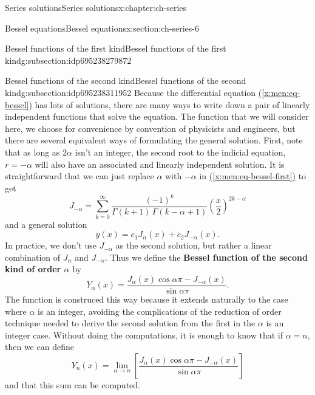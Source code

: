 \documentclass[oneside,10pt,]{book}
\newcommand{\xreffont}{\relax}
\newcommand{\terminology}[1]{\textbf{#1}}
\numberwithin{equation}{section}
\numberwithin{equation}{section}
\begin{document}
\begin{chapterptx}{Series solutions}{}{Series solutions}{}{}{x:chapter:ch-series}
\begin{sectionptx}{Bessel equations}{}{Bessel equations}{}{}{x:section:ch-series-6}
\begin{subsectionptx}{Bessel functions of the first kind}{}{Bessel functions of the first kind}{}{}{g:subsection:idp695238279872}
\end{subsectionptx}
%
%
\typeout{************************************************}
\typeout{************************************************}
%
\begin{subsectionptx}{Bessel functions of the second kind}{}{Bessel functions of the second kind}{}{}{g:subsection:idp695238311952}
Because the differential equation \hyperref[x:men:eq-bessel]{({\xreffont\ref{x:men:eq-bessel}})} has lots of solutions, there are many ways to write down a pair of linearly independent functions that solve the equation. The function that we will consider here, we choose for convenience by convention of physicists and engineers, but there are several equivalent ways of formulating the general solution. First, note that as long as \(2\alpha\) isn't an integer, the second root to the indicial equation, \(r = -\alpha\) will also have an associated and linearly independent solution. It is straightforward that we can just replace \(\alpha\) with \(-\alpha\) in \hyperref[x:men:eq-bessel-first]{({\xreffont\ref{x:men:eq-bessel-first}})} to get%
\begin{equation*}
J_{-\alpha} = \sum_{k=0}^\infty \frac{(-1)^k}{\Gamma(k + 1) \, \Gamma(k - \alpha + 1)} \left(\frac{x}{2}\right)^{2k - \alpha}
\end{equation*}
and a general solution%
\begin{equation*}
y(x) = c_1 J_\alpha(x) + c_2 J_{-\alpha}(x).
\end{equation*}
In practice, we don't use \(J_{-\alpha}\) as the second solution, but rather a linear combination of \(J_{\alpha}\) and \(J_{-\alpha}\). Thus we define the \terminology{Bessel function of the second kind of order \(\alpha\)} by%
\begin{equation*}
Y_\alpha(x) = \frac{J_\alpha(x) \cos \alpha \pi - J_{-\alpha}(x)}{\sin \alpha \pi}.
\end{equation*}
The function is construced this way because it extends naturally to the case where \(\alpha\) is an integer, avoiding the complications of the reduction of order technique needed to derive the second solution from the first in the \(\alpha\) is an integer case. Without doing the computations, it is enough to know that if \(\alpha = n\), then we can define%
\begin{equation*}
Y_n(x) = \lim_{\alpha \to n} \left[\frac{J_\alpha(x) \cos \alpha \pi - J_{-\alpha}(x)}{\sin \alpha \pi}\right]
\end{equation*}
and that this sum can be computed.%

\end{subsectionptx}
\end{sectionptx}
\end{chapterptx}
\end{document}
